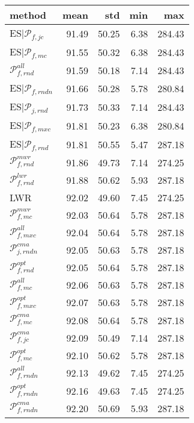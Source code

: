 \begin{tabular}{|@{}l@{}|@{}r@{}|@{}r@{}|@{}r@{}|@{}r@{}|}\hline
method & mean & std & min & max \\ \hline\hline
ES$|{\mathcal{P}_{f,jc}}$ &  91.49 &  50.25 &  6.38 &  284.43  \\ 
ES\boldmath$|\mathcal{P}_{f,mc}$ &  91.55 &  50.32 &  6.38 &  284.43  \\ 
${\mathcal{P}_{f,rnd}^{all}}$ &  91.59 &  50.18 &  7.14 &  284.43  \\ 
ES$|{\mathcal{P}_{f,rndn}}$ &  91.66 &  50.28 &  5.78 &  280.84  \\ 
ES$|{\mathcal{P}_{j,rnd}}$ &  91.73 &  50.33 &  7.14 &  284.43  \\ 
ES$|{\mathcal{P}_{f,mxc}}$ &  91.81 &  50.23 &  6.38 &  280.84  \\ 
ES$|{\mathcal{P}_{f,rnd}}$ &  91.81 &  50.55 &  5.47 &  287.18  \\ 
${\mathcal{P}_{f,rnd}^{mwr}}$ &  91.86 &  49.73 &  7.14 &  274.25  \\ 
${\mathcal{P}_{f,rnd}^{lwr}}$ &  91.88 &  50.62 &  5.93 &  287.18  \\ 
LWR &  92.02 &  49.60 &  7.45 &  274.25  \\ 
\boldmath${\mathcal{P}_{f,mc}^{mwr}}$ &  92.03 &  50.64 &  5.78 &  287.18  \\ 
${\mathcal{P}_{f,mxc}^{all}}$ &  92.04 &  50.64 &  5.78 &  287.18  \\ 
${\mathcal{P}_{j,rndn}^{cma}}$ &  92.05 &  50.63 &  5.78 &  287.18  \\ 
${\mathcal{P}_{f,rnd}^{opt}}$ &  92.05 &  50.64 &  5.78 &  287.18  \\ 
\boldmath${\mathcal{P}_{f,mc}^{all}}$ &  92.06 &  50.63 &  5.78 &  287.18  \\ 
${\mathcal{P}_{f,mxc}^{opt}}$ &  92.07 &  50.63 &  5.78 &  287.18  \\ 
\boldmath${\mathcal{P}_{f,mc}^{cma}}$ &  92.08 &  50.64 &  5.78 &  287.18  \\ 
${\mathcal{P}_{f,jc}^{cma}}$ &  92.09 &  50.49 &  7.14 &  287.18  \\ 
\boldmath${\mathcal{P}_{f,mc}^{opt}}$ &  92.10 &  50.62 &  5.78 &  287.18  \\ 
${\mathcal{P}_{f,rndn}^{all}}$ &  92.13 &  49.62 &  7.45 &  274.25  \\ 
${\mathcal{P}_{f,rndn}^{opt}}$ &  92.16 &  49.63 &  7.45 &  274.25  \\ 
${\mathcal{P}_{f,rndn}^{cma}}$ &  92.20 &  50.69 &  5.93 &  287.18  \\ 

\end{tabular}
